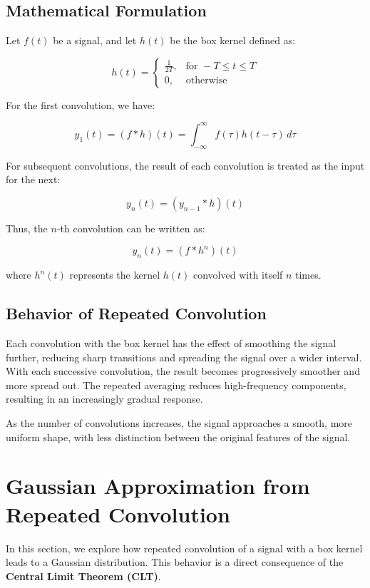 \documentclass{article}
\begin{document}
\subsection*{Mathematical Formulation}

Let \( f(t) \) be a signal, and let \( h(t) \) be the box kernel defined as:

\[
h(t) =
\begin{cases}
\frac{1}{2T}, & \text{for } -T \leq t \leq T \\
0, & \text{otherwise}
\end{cases}
\]

For the first convolution, we have:

\[
y_1(t) = (f * h)(t) = \int_{-\infty}^{\infty} f(\tau) h(t - \tau) \, d\tau
\]

For subsequent convolutions, the result of each convolution is treated as the input for the next:

\[
y_n(t) = (y_{n-1} * h)(t)
\]

Thus, the \( n \)-th convolution can be written as:

\[
y_n(t) = (f * h^n)(t)
\]

where \( h^n(t) \) represents the kernel \( h(t) \) convolved with itself \( n \) times.

\subsection*{Behavior of Repeated Convolution}

Each convolution with the box kernel has the effect of smoothing the signal further, reducing sharp transitions and spreading the signal over a wider interval. With each successive convolution, the result becomes progressively smoother and more spread out. The repeated averaging reduces high-frequency components, resulting in an increasingly gradual response.

As the number of convolutions increases, the signal approaches a smooth, more uniform shape, with less distinction between the original features of the signal.


 \section{Gaussian Approximation from Repeated Convolution}

In this section, we explore how repeated convolution of a signal with a box kernel leads to a Gaussian distribution. This behavior is a direct consequence of the \textbf{Central Limit Theorem (CLT)}. 
\end{document}
